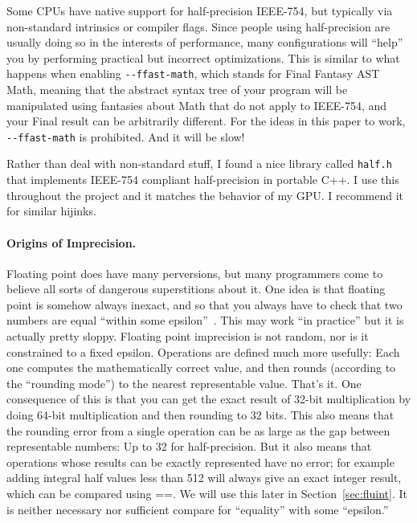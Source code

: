 \documentclass[twocolumn]{article}
\begin{document}
Some CPUs have native support for half-precision IEEE-754, but typically
via non-standard intrinsics or compiler flags. Since people using
half-precision are usually doing so in the interests of performance,
many configurations will ``help'' you by performing practical but
incorrect optimizations. This is similar to what happens when enabling
\verb|--ffast-math|, which stands for Final Fantasy AST Math, meaning
that the abstract syntax tree of your program will be manipulated
using fantasies about Math that do not apply to IEEE-754, and your
Final result can be arbitrarily different. For the ideas in this paper
to work, \verb|--ffast-math| is prohibited. And it will be slow!

Rather than deal with non-standard stuff, I found a nice library
called {\tt half.h}~\cite{half} that implements IEEE-754 compliant
half-precision in portable C++. I use this throughout the project
and it matches the behavior of my GPU. I recommend it for similar
hijinks.

\paragraph{Origins of Imprecision.}
Floating point does have many perversions, but many programmers come
to believe all sorts of dangerous superstitions about it. One idea is
that floating point is somehow always inexact, and so that you always
have to check that two numbers are equal ``within some
epsilon''~\cite{murphy2014epsilon}. This may work ``in practice'' but
it is actually pretty sloppy. Floating point imprecision is not
random, nor is it constrained to a fixed epsilon. Operations are
defined much more usefully: Each one computes the mathematically
correct value, and then rounds (according to the ``rounding mode'') to
the nearest representable value. That's it. One consequence of this is
that you can get the exact result of 32-bit multiplication by doing
64-bit multiplication and then rounding to 32 bits. This also means
that the rounding error from a single operation can be as large as the
gap between representable numbers: Up to 32 for half-precision. But it
also means that operations whose results can be exactly represented
have no error; for example adding integral half values less than 512
will always give an exact integer result, which can be compared using
==. We will use this later in Section~\ref{sec:fluint}. It is
neither necessary nor sufficient compare for ``equality'' with some
``epsilon.''
\end{document}
